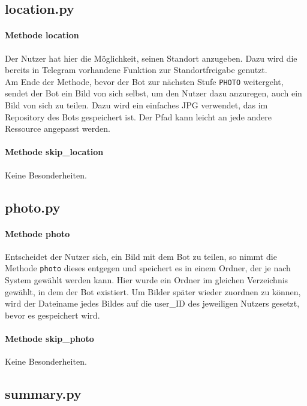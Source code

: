         
        \subsection{location.py} \label{location.py}
            \paragraph{Methode location}
                Der Nutzer hat hier die Möglichkeit, seinen Standort anzugeben. Dazu wird die bereits in Telegram vorhandene Funktion zur Standortfreigabe genutzt. \\
                Am Ende der Methode, bevor der Bot zur nächsten Stufe \verb|PHOTO| weitergeht, sendet der Bot ein Bild von sich selbst, um den Nutzer dazu anzuregen, auch ein Bild von sich zu teilen. Dazu wird ein einfaches JPG verwendet, das im Repository des Bots gespeichert ist. Der Pfad kann leicht an jede andere Ressource angepasst werden.

            \paragraph{Methode skip\_location}
                Keine Besonderheiten.
        

        \subsection{photo.py} \label{photo.py}
            \paragraph{Methode photo}
                Entscheidet der Nutzer sich, ein Bild mit dem Bot zu teilen, so nimmt die Methode \verb|photo| dieses entgegen und speichert es in einem Ordner, der je nach System gewählt werden kann. Hier wurde ein Ordner im gleichen Verzeichnis gewählt, in dem der Bot existiert. Um Bilder später wieder zuordnen zu können, wird der Dateiname jedes Bildes auf die user\_ID des jeweiligen Nutzers gesetzt, bevor es gespeichert wird.

            \paragraph{Methode skip\_photo}
                Keine Besonderheiten.
        

        \subsection{summary.py} \label{summary.py}
